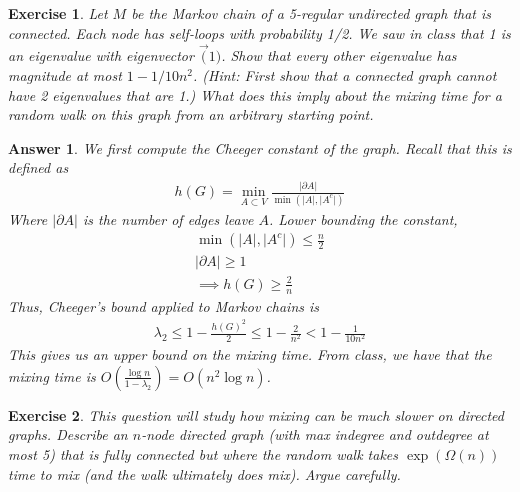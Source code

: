 \documentclass[12pt]{article}
\theoremstyle{colon}
\newtheorem{exercise}{Exercise}
\newtheorem*{answer}{Answer}
\begin{document}
\clearpage

\begin{exercise}
  Let $M$ be the Markov chain of a 5-regular undirected graph that is connected. Each node has self-loops with probability 1/2. We saw in class that 1 is an eigenvalue with eigenvector $\vec(1)$. Show that every other eigenvalue has magnitude at most $1-1/10n^2$. (Hint: First show that a connected graph cannot have 2 eigenvalues that are 1.) What does this imply about the mixing time for a random walk on this graph from an arbitrary starting point.
\end{exercise}

\begin{answer}
  We first compute the Cheeger constant of the graph. Recall that this is defined as
  \begin{gather*}
    h(G) = \min_{A \subset V} \frac{\lvert \partial  A \rvert}{\min(\lvert A \rvert, \lvert A^c \rvert)}
  \end{gather*}
  Where $\lvert \partial  A \rvert$ is the number of edges leave $A$. Lower bounding the constant,
  \begin{gather*}
    \min(\lvert A \rvert, \lvert A^c \rvert) \leq \frac{n}{2} \\
    \lvert \partial  A \rvert \geq 1 \\
    \implies h(G) \geq \frac{2}{n}
  \end{gather*}
  Thus, Cheeger's bound applied to Markov chains is
  \begin{gather*}
    \lambda_2 \leq 1 - \frac{h(G)^2}{2} \leq 1 - \frac{2}{n^2} < 1 - \frac{1}{10n^2}
  \end{gather*}
  This gives us an upper bound on the mixing time. From class, we have that the mixing time is $O(\frac{\log n}{1 - \lambda_2}) = O(n^2 \log n)$.
\end{answer}

\clearpage

\begin{exercise}
  This question will study how mixing can be much slower on directed graphs. Describe an $n$-node directed graph (with max indegree and outdegree at most 5) that is fully connected but where the random walk takes $\exp (\Omega(n))$ time to mix (and the walk ultimately does mix). Argue carefully.
\end{exercise}
\end{document}
